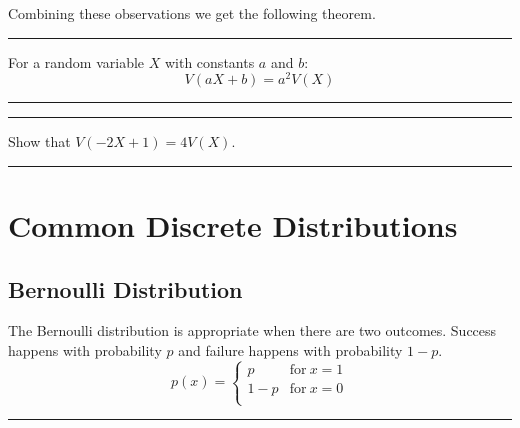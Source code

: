 \documentclass[
]{book}
\theoremstyle{definition}
\theoremstyle{definition}
\theoremstyle{definition}
\theoremstyle{remark}
\let\BeginKnitrBlock\begin \let\EndKnitrBlock\end
\begin{document}
Combining these observations we get the following theorem.

\begin{center}\rule{0.5\linewidth}{0.5pt}\end{center}

\BeginKnitrBlock{theorem}[V(aX+b)]
\protect\hypertarget{thm:unnamed-chunk-18}{}{\label{thm:unnamed-chunk-18} {} }For a random variable \(X\) with constants \(a\) and \(b\):
\[V(aX+b) = a^2 V(X)\]
\EndKnitrBlock{theorem}

\begin{center}\rule{0.5\linewidth}{0.5pt}\end{center}

\begin{center}\rule{0.5\linewidth}{0.5pt}\end{center}

\BeginKnitrBlock{exercise}
\protect\hypertarget{exr:unnamed-chunk-19}{}{\label{exr:unnamed-chunk-19} }Show that \(V(-2X+1) = 4V(X)\).
\EndKnitrBlock{exercise}

\begin{center}\rule{0.5\linewidth}{0.5pt}\end{center}

\hypertarget{common-discrete-distributions}{%
\chapter{Common Discrete Distributions}\label{common-discrete-distributions}}

\hypertarget{bernoulli-distribution}{%
\section{Bernoulli Distribution}\label{bernoulli-distribution}}

The Bernoulli distribution is appropriate when there are two outcomes. Success happens with probability \(p\) and failure happens with probability \(1-p\).
\begin{equation*} 
    p(x) =
    \left\{
        \begin{array}{cc}
                p & \mathrm{for\ } x=1 \\
                1-p & \mathrm{for\ } x=0 \\
        \end{array} 
    \right.
\end{equation*}

\begin{center}\rule{0.5\linewidth}{0.5pt}\end{center}
\end{document}
